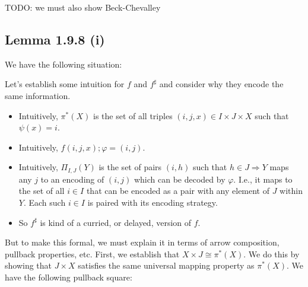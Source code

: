 \documentclass{article}
\begin{document}
\begin{center}
\end{center}

TODO: we must also show Beck-Chevalley

\subsection*{Lemma 1.9.8 (i)}

We have the following situation:

\begin{center}
\end{center}

Let's establish some intuition for $f$ and $f^\sharp$ and consider why they encode the same information.

\begin{itemize}
\item Intuitively, $\pi^*(X)$ is the set of all triples $(i,j,x) \in I \times J \times X$ such that $\psi(x)=i$.
\item Intuitively, $f(i,j,x);\varphi = (i,j)$.
\item Intuitively, $\Pi_{I,J}(Y)$ is the set of pairs $(i,h)$ such that $h \in J \Rightarrow Y$ maps any $j$ to an 
      encoding of $(i,j)$ which can be decoded by $\varphi$. I.e., it maps to the set of all $i \in I$ that can be encoded
      as a pair with any element of $J$ within $Y$. Each such $i \in I$ is paired with its encoding strategy.
\item So $f^\sharp$ is kind of a curried, or delayed, version of $f$.
\end{itemize}
But to make this formal, we must explain it in terms of arrow composition, pullback properties, etc. 
First, we establish that $X \times J \cong \pi^*(X)$. We do this by showing that $J \times X$ satisfies the
same universal mapping property as $\pi^*(X)$. We have the following pullback square:
\end{document}
